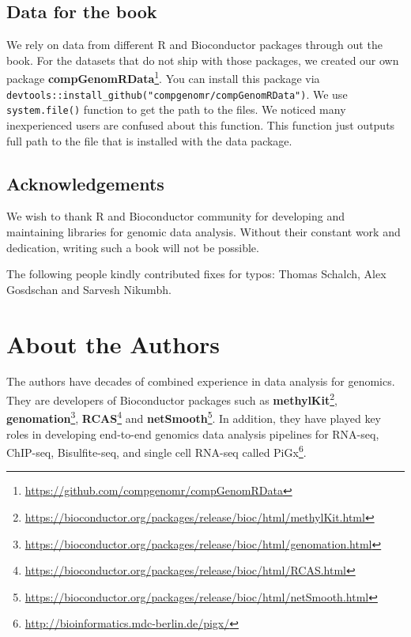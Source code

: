 \documentclass[12pt,]{krantz}
\renewcommand{\href}[2]{#2\footnote{\url{#1}}}
\begin{document}
\hypertarget{data-for-the-book}{%
\section*{Data for the book}\label{data-for-the-book}}


We rely on data from different R and Bioconductor packages through out the book. For the datasets that do not ship with those packages, we created our own package \href{https://github.com/compgenomr/compGenomRData}{\textbf{compGenomRData}}. You can install this package via \texttt{devtools::install\_github("compgenomr/compGenomRData")}. We use \texttt{system.file()} function to get the path to the files. We noticed many inexperienced users are confused about this function. This function just outputs full path to the file that is installed with the data package.

\hypertarget{acknowledgements}{%
\section*{Acknowledgements}\label{acknowledgements}}


We wish to thank R and Bioconductor community for developing and maintaining libraries for genomic data analysis. Without their constant work and dedication, writing such a book will not be possible.

The following people kindly contributed fixes for typos: Thomas Schalch, Alex Gosdschan and Sarvesh Nikumbh.

\hypertarget{about-the-authors}{%
\chapter*{About the Authors}\label{about-the-authors}}


The authors have decades of combined experience in data analysis for genomics. They are developers of Bioconductor packages such as \href{https://bioconductor.org/packages/release/bioc/html/methylKit.html}{\textbf{methylKit}}, \href{https://bioconductor.org/packages/release/bioc/html/genomation.html}{\textbf{genomation}}, \href{https://bioconductor.org/packages/release/bioc/html/RCAS.html}{\textbf{RCAS}} and \href{https://bioconductor.org/packages/release/bioc/html/netSmooth.html}{\textbf{netSmooth}}. In addition, they have played key roles in developing end-to-end genomics data analysis pipelines for RNA-seq, ChIP-seq, Bisulfite-seq, and single cell RNA-seq called \href{http://bioinformatics.mdc-berlin.de/pigx/}{PiGx}.
\end{document}
